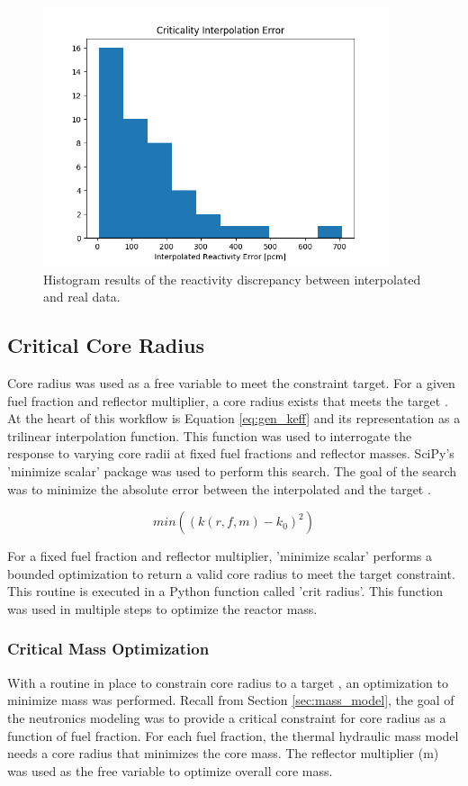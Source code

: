 \begin{figure}[h]
    \centering
    \includegraphics[width=4in]{../images/check_interp.png}
\caption{Histogram results of the reactivity discrepancy between interpolated
and real data.}
\label{fig:interp_check}
\end{figure}

\subsection{Critical Core Radius}
Core radius was used as a free variable to meet the \keff constraint target. For
a given fuel fraction and reflector multiplier, a core radius exists that meets
the target \keff. At the heart of this workflow is Equation \ref{eq:gen_keff}
and its representation as a trilinear interpolation function. This function was
used to interrogate the \keff response to varying core radii at fixed fuel
fractions and reflector masses. SciPy's 'minimize scalar' package was used to
perform this search. The goal of the search was to minimize the absolute error
between the interpolated \keff and the target \keff.

\begin{equation}
    min( (k(r, f, m) - k_0)^2 )
\end{equation}

For a fixed fuel fraction and reflector multiplier, 'minimize scalar' performs a
bounded optimization to return a valid core radius to meet the target \keff
constraint. This routine is executed in a Python function called 'crit radius'.
This function was used in multiple steps to optimize the reactor mass.

\subsubsection{Critical Mass Optimization}
With a routine in place to constrain core radius to a target \keff, an
optimization to minimize mass was performed. Recall from Section
\ref{sec:mass_model}, the goal of the neutronics modeling was to provide a
critical constraint for core radius as a function of fuel fraction. For each
fuel fraction, the thermal hydraulic mass model needs a core radius that
minimizes the core mass. The reflector multiplier (m) was used as the free
variable to optimize overall core mass. 

